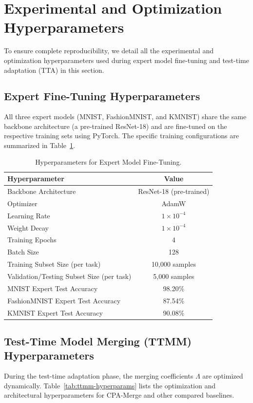 \documentclass{article}
\theoremstyle{plain}
\theoremstyle{definition}
\theoremstyle{remark}
\begin{document}
\section{Experimental and Optimization Hyperparameters}
\label{appendix-hyperparameters}

To ensure complete reproducibility, we detail all the experimental and optimization hyperparameters used during expert model fine-tuning and test-time adaptation (TTA) in this section.

\subsection{Expert Fine-Tuning Hyperparameters}
All three expert models (MNIST, FashionMNIST, and KMNIST) share the same backbone architecture (a pre-trained ResNet-18) and are fine-tuned on the respective training sets using PyTorch. The specific training configurations are summarized in Table~\ref{tab:finetuning-hyperparams}.

\begin{table}[h]
\caption{Hyperparameters for Expert Model Fine-Tuning.}
\label{tab:finetuning-hyperparams}
\vskip 0.1in
\begin{center}
\begin{small}
\begin{tabular}{lc}
\toprule
Hyperparameter & Value \\
\midrule
Backbone Architecture & ResNet-18 (pre-trained) \\
Optimizer & AdamW \\
Learning Rate & $1\times 10^{-4}$ \\
Weight Decay & $1\times 10^{-4}$ \\
Training Epochs & 4 \\
Batch Size & 128 \\
Training Subset Size (per task) & 10,000 samples \\
Validation/Testing Subset Size (per task) & 5,000 samples \\
MNIST Expert Test Accuracy & 98.20\% \\
FashionMNIST Expert Test Accuracy & 87.54\% \\
KMNIST Expert Test Accuracy & 90.08\% \\
\bottomrule
\end{tabular}
\end{small}
\end{center}
\end{table}

\subsection{Test-Time Model Merging (TTMM) Hyperparameters}
During the test-time adaptation phase, the merging coefficients $\Lambda$ are optimized dynamically. Table~\ref{tab:ttmm-hyperparams} lists the optimization and architectural hyperparameters for CPA-Merge and other compared baselines.
\end{document}
